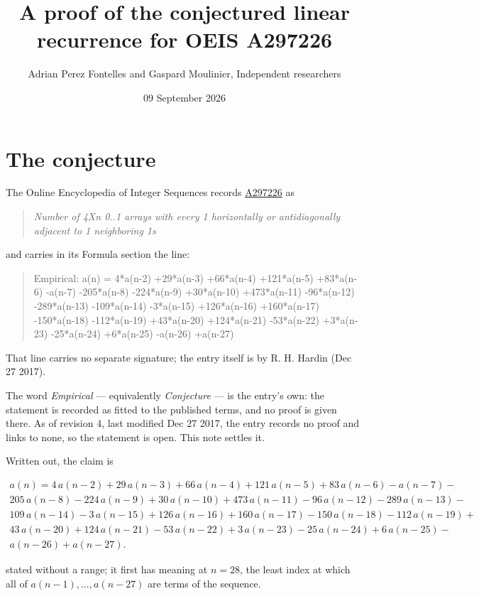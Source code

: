 \documentclass[11pt]{article}
\title{A proof of the conjectured linear recurrence for OEIS A297226}
\author{Adrian Perez Fontelles and Gaspard Moulinier, Independent researchers}
\date{09 September 2026}
\theoremstyle{definition}
\begin{document}
\maketitle
\section{The conjecture}

The Online Encyclopedia of Integer Sequences records \href{https://oeis.org/A297226}{A297226} as

\begin{quote}\itshape Number of 4Xn 0..1 arrays with every 1 horizontally or antidiagonally adjacent to 1 neighboring 1s\end{quote}

and carries in its Formula section the line:

\begin{quote}\ttfamily Empirical: a(n) = 4*a(n-2) +29*a(n-3) +66*a(n-4) +121*a(n-5) +83*a(n-6) -a(n-7) -205*a(n-8) -224*a(n-9) +30*a(n-10) +473*a(n-11) -96*a(n-12) -289*a(n-13) -109*a(n-14) -3*a(n-15) +126*a(n-16) +160*a(n-17) -150*a(n-18) -112*a(n-19) +43*a(n-20) +124*a(n-21) -53*a(n-22) +3*a(n-23) -25*a(n-24) +6*a(n-25) -a(n-26) +a(n-27)\end{quote}

That line carries no separate signature; the entry itself is by R. H. Hardin (Dec 27 2017).

The word {\itshape Empirical} --- equivalently {\itshape Conjecture} --- is the entry's own: the statement is recorded as fitted to the published terms, and no proof is given there. As of revision 4, last modified Dec 27 2017, the entry records no proof and links to none, so the statement is open. This note settles it.

Written out, the claim is

\begin{multline*} a(n) = 4\,a(n-2) + 29\,a(n-3) + 66\,a(n-4) + 121\,a(n-5) + 83\,a(n-6) - a(n-7) - \\ 205\,a(n-8) - 224\,a(n-9) + 30\,a(n-10) + 473\,a(n-11) - 96\,a(n-12) - 289\,a(n-13) - \\ 109\,a(n-14) - 3\,a(n-15) + 126\,a(n-16) + 160\,a(n-17) - 150\,a(n-18) - 112\,a(n-19) + \\ 43\,a(n-20) + 124\,a(n-21) - 53\,a(n-22) + 3\,a(n-23) - 25\,a(n-24) + 6\,a(n-25) - \\ a(n-26) + a(n-27). \end{multline*}

stated without a range; it first has meaning at $n = 28$, the least index at which all of $a(n-1),\dots,a(n-27)$ are terms of the sequence.
\end{document}
